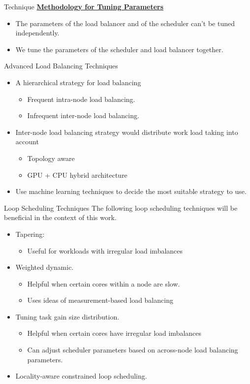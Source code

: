 \begin{frame}{Technique}
         {\scriptsize \underline{\textbf{Methodology for Tuning Parameters}}}
         \begin{itemize}
               \tiny \item \tiny The parameters of the load balancer and of the scheduler can't be tuned independently.
             \item \tiny We tune the parameters of the scheduler and load balancer together.
         \end{itemize} 
   \end{frame} 
   
\begin{frame}{Advanced Load Balancing Techniques} 
\begin{itemize}
\item A hierarchical strategy for load balancing
\begin{itemize}
\item Frequent intra-node load balancing.
\item Infrequent inter-node load balancing.
\end{itemize}
\item Inter-node load balancing strategy would distribute work load taking into account
\begin{itemize}
\item Topology aware
\item GPU + CPU hybrid architecture
\end{itemize}
\item Use machine learning techniques to decide the most suitable strategy to use.
\end{itemize}
\end{frame} 

   
   
\begin{frame}{Loop Scheduling Techniques}
The following loop scheduling techniques will be beneficial in the
context of this work.
\begin{itemize}
\item Tapering:
\begin{itemize}
\item Useful for workloads with irregular load imbalances
\end{itemize}
\item Weighted dynamic.
\begin{itemize}
\item Helpful when certain cores within a node are slow.
\item Uses ideas of measurement-based load balancing
\end{itemize}
\item Tuning task gain size distribution.
\begin{itemize}
\item Helpful when certain cores have irregular load imbalances
\item Can adjust scheduler parameters based on across-node load balancing parameters.
\end{itemize}
\item Locality-aware constrained loop scheduling.
\end{itemize}
\end{frame}

